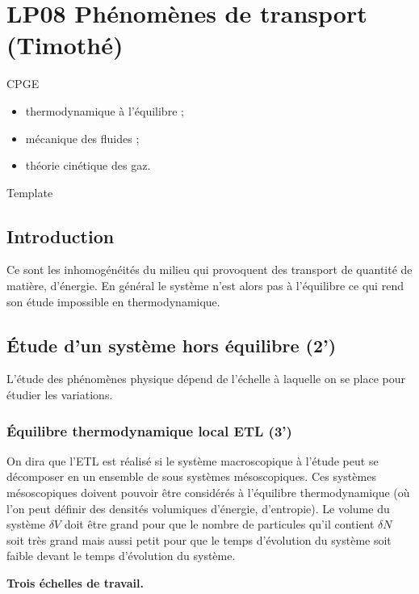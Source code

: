 \section{LP08 Phénomènes de transport (Timothé)}

\niveau CPGE

\prerequis
\begin{itemize}
\item thermodynamique à l'équilibre ;
\item mécanique des fluides ;
\item théorie cinétique des gaz.
\end{itemize}

\objectif Template

\footnotesize{}

\subsection{Introduction}

Ce sont les inhomogénéités du milieu qui provoquent des transport de quantité de matière, d'énergie.
En général le système n'est alors pas à l'équilibre ce qui rend son étude impossible en thermodynamique.

\subsection{Étude d'un système hors équilibre (2')}

L'étude des phénomènes physique dépend de l'échelle à laquelle on se place pour étudier les variations.

\subsubsection{Équilibre thermodynamique local ETL (3')}

On dira que l'ETL est réalisé si le système macroscopique à l'étude peut se décomposer en un ensemble de sous systèmes mésoscopiques.
Ces systèmes mésoscopiques doivent pouvoir être considérés à l'équilibre thermodynamique (où l'on peut définir des densités volumiques d'énergie, d'entropie).
Le volume du système $\delta V$ doit être grand pour que le nombre de particules qu'il contient $\delta N$ soit très grand mais aussi petit pour que le temps d'évolution du système soit faible devant le temps d'évolution du système.

\begin{slide}
\textbf{Trois échelles de travail.}
\end{slide}

